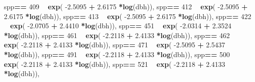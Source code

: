 \documentclass[
]{article}
\newenvironment{Shaded}{\begin{snugshade}}{\end{snugshade}}
\newcommand{\DecValTok}[1]{\textcolor[rgb]{0.00,0.00,0.81}{#1}}
\newcommand{\FloatTok}[1]{\textcolor[rgb]{0.00,0.00,0.81}{#1}}
\newcommand{\KeywordTok}[1]{\textcolor[rgb]{0.13,0.29,0.53}{\textbf{#1}}}
\newcommand{\NormalTok}[1]{#1}
\newcommand{\OperatorTok}[1]{\textcolor[rgb]{0.81,0.36,0.00}{\textbf{#1}}}
\newcommand{\StringTok}[1]{\textcolor[rgb]{0.31,0.60,0.02}{#1}}
\begin{document}
\begin{Shaded}
\begin{Highlighting}[]
\NormalTok{    spp}\OperatorTok{==}\StringTok{ }\DecValTok{409} \OperatorTok{~}\StringTok{ }\KeywordTok{exp}\NormalTok{( }\FloatTok{-2.5095}   \OperatorTok{+}\StringTok{    }\FloatTok{2.6175} \OperatorTok{*}\KeywordTok{log}\NormalTok{(dbh)),}
\NormalTok{    spp}\OperatorTok{==}\StringTok{ }\DecValTok{412} \OperatorTok{~}\StringTok{ }\KeywordTok{exp}\NormalTok{( }\FloatTok{-2.5095}   \OperatorTok{+}\StringTok{    }\FloatTok{2.6175} \OperatorTok{*}\KeywordTok{log}\NormalTok{(dbh)),}
\NormalTok{    spp}\OperatorTok{==}\StringTok{ }\DecValTok{413} \OperatorTok{~}\StringTok{ }\KeywordTok{exp}\NormalTok{( }\FloatTok{-2.5095}   \OperatorTok{+}\StringTok{    }\FloatTok{2.6175} \OperatorTok{*}\KeywordTok{log}\NormalTok{(dbh)),}
\NormalTok{    spp}\OperatorTok{==}\StringTok{ }\DecValTok{422} \OperatorTok{~}\StringTok{ }\KeywordTok{exp}\NormalTok{( }\FloatTok{-2.0705}   \OperatorTok{+}\StringTok{    }\FloatTok{2.4410} \OperatorTok{*}\KeywordTok{log}\NormalTok{(dbh)),}
\NormalTok{    spp}\OperatorTok{==}\StringTok{ }\DecValTok{451} \OperatorTok{~}\StringTok{ }\KeywordTok{exp}\NormalTok{( }\FloatTok{-2.0314}   \OperatorTok{+}\StringTok{    }\FloatTok{2.3524} \OperatorTok{*}\KeywordTok{log}\NormalTok{(dbh)),}
\NormalTok{    spp}\OperatorTok{==}\StringTok{ }\DecValTok{461} \OperatorTok{~}\StringTok{ }\KeywordTok{exp}\NormalTok{( }\FloatTok{-2.2118}   \OperatorTok{+}\StringTok{    }\FloatTok{2.4133} \OperatorTok{*}\KeywordTok{log}\NormalTok{(dbh)),}
\NormalTok{    spp}\OperatorTok{==}\StringTok{ }\DecValTok{462} \OperatorTok{~}\StringTok{ }\KeywordTok{exp}\NormalTok{( }\FloatTok{-2.2118}   \OperatorTok{+}\StringTok{    }\FloatTok{2.4133} \OperatorTok{*}\KeywordTok{log}\NormalTok{(dbh)),}
\NormalTok{    spp}\OperatorTok{==}\StringTok{ }\DecValTok{471} \OperatorTok{~}\StringTok{ }\KeywordTok{exp}\NormalTok{( }\FloatTok{-2.5095}   \OperatorTok{+}\StringTok{    }\FloatTok{2.5437} \OperatorTok{*}\KeywordTok{log}\NormalTok{(dbh)),}
\NormalTok{    spp}\OperatorTok{==}\StringTok{ }\DecValTok{491} \OperatorTok{~}\StringTok{ }\KeywordTok{exp}\NormalTok{( }\FloatTok{-2.2118}   \OperatorTok{+}\StringTok{    }\FloatTok{2.4133} \OperatorTok{*}\KeywordTok{log}\NormalTok{(dbh)),}
\NormalTok{    spp}\OperatorTok{==}\StringTok{ }\DecValTok{500} \OperatorTok{~}\StringTok{ }\KeywordTok{exp}\NormalTok{( }\FloatTok{-2.2118}   \OperatorTok{+}\StringTok{    }\FloatTok{2.4133} \OperatorTok{*}\KeywordTok{log}\NormalTok{(dbh)),}
\NormalTok{    spp}\OperatorTok{==}\StringTok{ }\DecValTok{521} \OperatorTok{~}\StringTok{ }\KeywordTok{exp}\NormalTok{( }\FloatTok{-2.2118}   \OperatorTok{+}\StringTok{    }\FloatTok{2.4133} \OperatorTok{*}\KeywordTok{log}\NormalTok{(dbh)),}

\end{Highlighting}
\end{Shaded}
\end{document}
